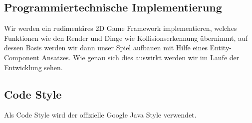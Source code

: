 \subsection{Programmiertechnische Implementierung}
Wir werden ein rudimentäres 2D Game Framework implementieren, welches Funktionen wie den Render und Dinge wie Kollisionserkennung übernimmt, auf dessen Basis werden wir dann unser Spiel aufbauen mit Hilfe eines Entity-Component Ansatzes. Wie genau sich dies auswirkt werden wir im Laufe der Entwicklung sehen. 
\subsection{Code Style}
Als Code Style wird der offizielle Google Java Style verwendet.

